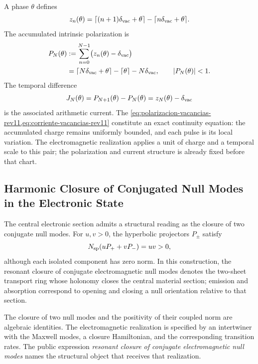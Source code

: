 A phase \(\theta\) defines
\[
 z_n(\theta)=\lceil(n+1)\delta_{\rm vac}+\theta\rceil
 -\lceil n\delta_{\rm vac}+\theta\rceil.
\]
The accumulated intrinsic polarization is
\begin{equation}
 \begin{aligned}
 P_N(\theta)
 &:=\sum_{n=0}^{N-1}\bigl(z_n(\theta)-\delta_{\rm vac}\bigr)\\
 &=\lceil N\delta_{\rm vac}+\theta\rceil-
   \lceil\theta\rceil-N\delta_{\rm vac},
 \qquad |P_N(\theta)|<1.
 \end{aligned}
 \label{eq:polarizacion-vacancias-rev11}
\end{equation}
The temporal difference
\begin{equation}
 J_N(\theta)=P_{N+1}(\theta)-P_N(\theta)
 =z_N(\theta)-\delta_{\rm vac}
 \label{eq:corriente-vacancias-rev11}
\end{equation}
is the associated arithmetic current. The
\cref{eq:polarizacion-vacancias-rev11,eq:corriente-vacancias-rev11}
constitute an exact continuity equation: the accumulated charge remains
uniformly bounded, and each pulse is its local variation. The electromagnetic
realization applies a unit of charge and a temporal scale to this pair;
the polarization and current structure is already fixed before that chart.

\subsection{Harmonic Closure of Conjugated Null Modes in the Electronic State}
\label{sec:nido-armonico-modos-nulos-rev11}

The central electronic section admits a structural reading as the closure
of two conjugate null modes. For \(u,v>0\), the hyperbolic projectors
\(P_\pm\) satisfy
\[
 N_{\rm sp}(uP_++vP_-)=uv>0,
\]
although each isolated component has zero norm. In this construction, the resonant closure of conjugate electromagnetic null modes denotes the two-sheet transport ring whose holonomy closes the central material section; emission and absorption correspond to opening and closing a null orientation relative to that section.

\begin{statusbox}[title={Photonic realization of harmonic closure}]
The closure of two null modes and the positivity of their coupled norm are
algebraic identities. The electromagnetic realization is specified by
an intertwiner with the Maxwell modes, a closure Hamiltonian, and the
corresponding transition rates. The public expression
\emph{resonant closure of conjugate electromagnetic null modes}
names the structural object that receives that realization.
\end{statusbox}
